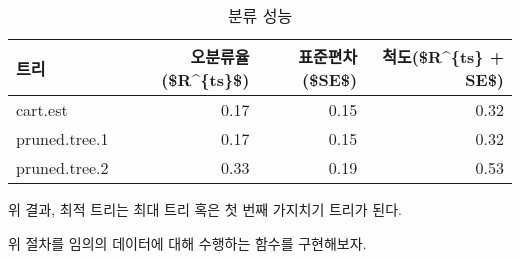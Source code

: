\documentclass[]{book}
\begin{document}
\begin{table}[t]

\caption{\label{tab:misclassification-rate-table}분류 성능}
\centering
\begin{tabular}{lrrr}
\toprule
트리 & 오분류율(\$R\textasciicircum{}\{ts\}\$) & 표준편차(\$SE\$) & 척도(\$R\textasciicircum{}\{ts\} + SE\$)\\
\midrule
cart.est & 0.17 & 0.15 & 0.32\\
pruned.tree.1 & 0.17 & 0.15 & 0.32\\
pruned.tree.2 & 0.33 & 0.19 & 0.53\\
\bottomrule
\end{tabular}
\end{table}

위 결과, 최적 트리는 최대 트리 혹은 첫 번째 가지치기 트리가 된다.

위 절차를 임의의 데이터에 대해 수행하는 함수를 구현해보자.
\end{document}
